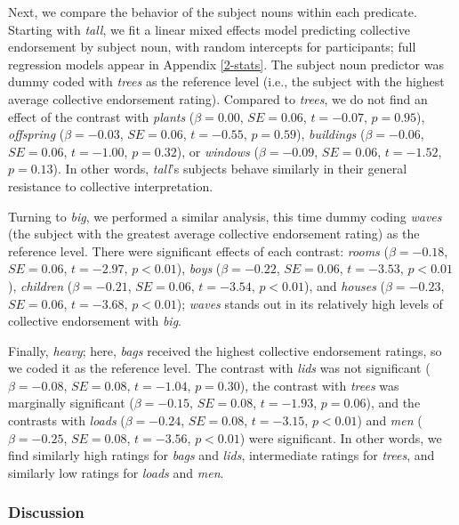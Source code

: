 \documentclass[preprint,12pt,authoryear,titlepage]{elsarticle}
\newcommand{\ndg}[1]{\textcolor{Green}{[ndg: #1]}}
\begin{document}

Next, we compare the behavior of the subject nouns within each predicate.  Starting with \emph{tall}, we fit a linear mixed effects model predicting collective endorsement by subject noun, with random intercepts for participants; full regression models appear in Appendix \ref{2-stats}. The subject noun predictor was dummy coded with \emph{trees} as the reference level (i.e., the subject with the highest average collective endorsement rating). Compared to \emph{trees}, we do not find an effect of the contrast with \emph{plants} ($\beta=0.00$, $SE=0.06$, $t=-0.07$, $p=0.95$), \emph{offspring} ($\beta=-0.03$, $SE=0.06$, $t=-0.55$, $p=0.59$), \emph{buildings} ($\beta=-0.06$, $SE=0.06$, $t=-1.00$, $p=0.32$), or \emph{windows} ($\beta=-0.09$, $SE=0.06$, $t=-1.52$, $p=0.13$). In other words, \emph{tall}'s subjects behave similarly in their general resistance to collective interpretation. 

Turning to \emph{big}, we performed a similar analysis, this time dummy coding \emph{waves} (the subject with the greatest average collective endorsement rating) as the reference level. There were significant effects of each contrast: \emph{rooms} ($\beta=-0.18$, $SE=0.06$, $t=-2.97$, $p<0.01$), \emph{boys} ($\beta=-0.22$, $SE=0.06$, $t=-3.53$, $p<0.01$), \emph{children} ($\beta=-0.21$, $SE=0.06$, $t=-3.54$, $p<0.01$), and \emph{houses} ($\beta=-0.23$, $SE=0.06$, $t=-3.68$, $p<0.01$); \emph{waves} stands out in its relatively high levels of collective endorsement with \emph{big}.

Finally, \emph{heavy}; here, \emph{bags} received the highest collective endorsement ratings, so we coded it as the reference level. The contrast with \emph{lids} was not significant ($\beta=-0.08$, $SE=0.08$, $t=-1.04$, $p=0.30$), the contrast with \emph{trees} was marginally significant ($\beta=-0.15$, $SE=0.08$, $t=-1.93$, $p=0.06$), and the contrasts with \emph{loads} ($\beta=-0.24$, $SE=0.08$, $t=-3.15$, $p<0.01$) and \emph{men} ($\beta=-0.25$, $SE=0.08$, $t=-3.56$, $p<0.01$) were significant. In other words, we find similarly high ratings for \emph{bags} and \emph{lids}, intermediate ratings for \emph{trees}, and similarly low ratings for \emph{loads} and \emph{men}.

\subsubsection{Discussion}
\end{document}
